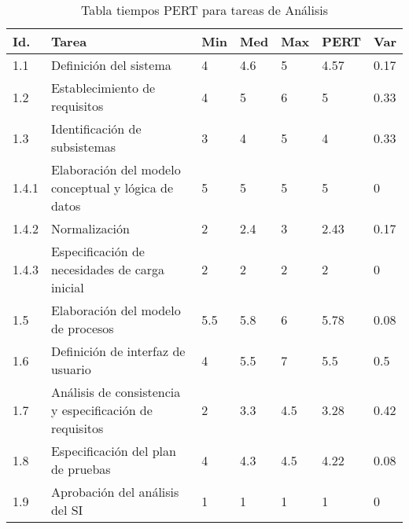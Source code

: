 \documentclass[11pt,a4paper,spanish,twoside]{report}
\begin{document}
\begin{table}[!h]
\centering
  \begin{tabular}{|p{0.8cm}||p{4cm}||p{0.75cm}|p{0.75cm}|p{0.75cm}|p{1.10cm}|
p{0.75cm}|}
    \hline
    \textbf{Id.} & \textbf{Tarea} & \textbf{Min} &
    \textbf{Med} & \textbf{Max} & \textbf{PERT} & \textbf{Var}\\
    \hline \hline
    1.1 & Definición del sistema & 4 & 4.6 & 5 & 4.57 & 0.17\\ 
    \hline
    1.2 & Establecimiento de requisitos & 4 & 5 & 6 & 5 & 0.33\\
    \hline 
    1.3 & Identificación de subsistemas & 3 & 4 & 5 & 4 & 0.33\\
    \hline
    1.4.1 & Elaboración del modelo conceptual y lógica de datos & 5 & 5 & 5 &
    5 & 0\\
    \hline
    1.4.2 & Normalización & 2 & 2.4 & 3 & 2.43 & 0.17\\
    \hline
    1.4.3 & Especificación de necesidades de carga inicial & 2 & 2 & 2 & 2 & 0\\
    \hline
    1.5 & Elaboración del modelo de procesos & 5.5 & 5.8 & 6 & 5.78 & 0.08\\
    \hline
    1.6 & Definición de interfaz de usuario & 4 & 5.5 & 7 & 5.5 & 0.5\\
    \hline
    1.7 & Análisis de consistencia y especificación de requisitos & 2 & 3.3
    & 4.5 & 3.28 & 0.42\\
    \hline
    1.8 & Especificación del plan de pruebas & 4 & 4.3 & 4.5 & 4.22 & 0.08\\
    \hline
    1.9 & Aprobación del análisis del SI & 1 & 1 & 1 & 1 & 0\\
    \hline
  \end{tabular}
  \caption{Tabla tiempos PERT para tareas de Análisis} \label{Tab:tareas1}
\end{table}
\end{document}
